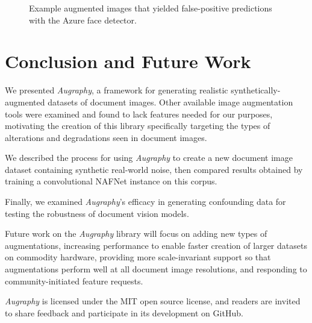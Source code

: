 \documentclass[runningheads]{llncs}
\begin{document}
\begin{figure}
    \centering{}
    \caption{Example augmented images that yielded false-positive predictions with the Azure face detector.}
    \label{fig:face-detection-mistakes}
\end{figure}

\section{Conclusion and Future Work}
We presented \emph{Augraphy}, a framework for generating realistic synthetically-augmented datasets of document images.
Other available image augmentation tools were examined and found to lack features needed for our purposes, motivating the creation of this library specifically targeting the types of alterations and degradations seen in document images.

We described the process for using \emph{Augraphy} to create a new document image dataset containing synthetic real-world noise, then compared results obtained by training a convolutional NAFNet instance on this corpus.

Finally, we examined \emph{Augraphy}'s efficacy in generating confounding data for testing the robustness of document vision models.

Future work on the \emph{Augraphy} library will focus on adding new types of augmentations, increasing performance to enable faster creation of larger datasets on commodity hardware, providing more scale-invariant support so that augmentations perform well at all document image resolutions, and responding to community-initiated feature requests.

\emph{Augraphy} is licensed under the MIT open source license, and readers are invited to share feedback and participate in its development on GitHub.


%
%
%


\end{document}
